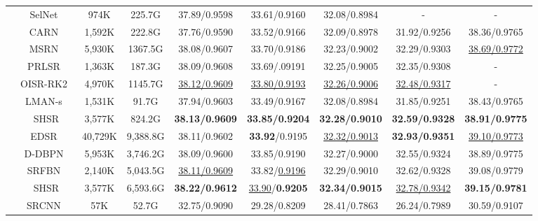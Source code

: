 \documentclass[manuscript,screen]{acmart}
\begin{document}
\begin{table*}[t]
\begin{tabular}{|c|c|c|c|c|c|c|c|c|}
		&SelNet~\cite{selnet_cvprw2017}&974K&225.7G& 
		37.89/0.9598& 33.61/0.9160& 32.08/0.8984& - &  - \\
		
		&CARN~\cite{carn_eccv2018}&1,592K&222.8G& 
		37.76/0.9590& 33.52/0.9166& 32.09/0.8978& 31.92/0.9256& 38.36/0.9765\\
		
		&MSRN~\cite{msrn_eccv2018}& 5,930K& 1367.5G& 
		38.08/0.9607& 33.70/0.9186& 32.23/0.9002& 32.29/0.9303& \underline{38.69/0.9772} \\
		
		&PRLSR~\cite{prlsr_icassp2020}& 1,363K& 187.3G&
		38.09/0.9608& 33.69/.09191& 32.25/0.9005& 32.35/0.9308& - \\
		
		&OISR-RK2~\cite{oisr_cvpr2019}& 4,970K& 1145.7G&
		\underline{38.12/0.9609}& \underline{33.80/0.9193}& \underline{32.26/0.9006}& \underline{32.48/0.9317}& - \\
		
		&LMAN-s~\cite{lman_tob2020}& 1,531K& 91.7G&
		37.94/0.9603& 33.49/0.9167& 32.08/0.8984& 31.85/0.9251& 38.43/0.9765 \\
		
		&SHSR& 3,577K& 824.2G& 
		\textbf{38.13/0.9609}& \textbf{33.85/0.9204}& \textbf{32.28/0.9010}& \textbf{32.59/0.9328}& \textbf{38.91/0.9775} \\
		
		\cline{2-9}
		
		&EDSR~\cite{edsr_cvpr2017}&40,729K& 9,388.8G& 
		38.11/0.9602& \textbf{33.92}/0.9195& \underline{32.32/0.9013}& \textbf{32.93/0.9351}& \underline{39.10/0.9773}\\
		
		&D-DBPN~\cite{dbpn_pami2020}& 5,953K& 3,746.2G& 
		38.09/0.9600& 33.85/0.9190& 32.27/0.9000& 32.55/0.9324& 38.89/0.9775\\
		
		&SRFBN~\cite{srfbn_cvpr2019}& 2,140K& 5,043.5G& 
		\underline{38.11/0.9609}& 33.82/\underline{0.9196}& 32.29/0.9010& 32.62/0.9328& 39.08/0.9779\\
		


		&SHSR& 3,577K& 6,593.6G&\textbf{38.22/0.9612}& \underline{33.90}/\textbf{0.9205}& \textbf{32.34/0.9015}& \underline{32.78/0.9342}& \textbf{39.15/0.9781} \\
		\hline
\hline
		\multirow{16}{*}{}& SRCNN~\cite{srcnn_pami2016} &57K &52.7G & 
		32.75/0.9090& 29.28/0.8209& 28.41/0.7863& 26.24/0.7989& 30.59/0.9107\\
		

\end{tabular}
\end{table*}
\end{document}
